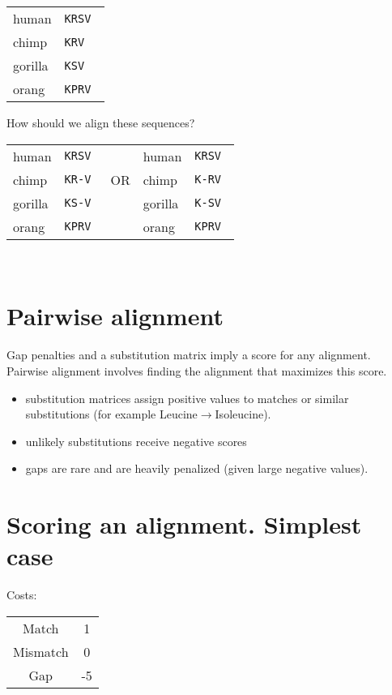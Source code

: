 \documentclass[landscape]{foils}
\begin{document}
\myNewSlide
\Large
\begin{center}
\begin{tabular}{ll}
human & {\tt KRSV }\\
chimp &  {\tt KRV }\\
gorilla &  {\tt KSV }\\
orang &  {\tt KPRV} \\
\end{tabular}
\par
How should we align these sequences?
\par

\begin{tabular}{|ll|c|ll|}
human & {\tt KRSV } & &  human & {\tt KRSV }  \\
chimp &  {\tt KR-V } & OR & chimp &  {\tt K-RV }\\
gorilla &  {\tt KS-V } & & gorilla &  {\tt K-SV }\\
orang &  {\tt KPRV}&  & orang &  {\tt KPRV} \\
\end{tabular}\\
\end{center}

\myNewSlide
\section*{Pairwise alignment}
Gap penalties and a substitution matrix imply a score for any alignment.  Pairwise alignment involves finding the alignment that maximizes this score.
\begin{itemize}
	\item substitution matrices assign positive values to matches or similar substitutions (for example Leucine$\rightarrow$Isoleucine).
	\item unlikely substitutions receive negative scores
	\item gaps are rare and are heavily penalized (given large negative values).
\end{itemize}

\myNewSlide
\section*{Scoring an alignment. Simplest case}
Costs:
\begin{center}
\begin{tabular}{cc}
Match & 1 \\
Mismatch & 0 \\
Gap & -5 \\
\end{tabular}
\end{center}
\end{document}
